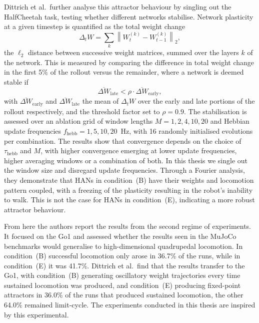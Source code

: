 \documentclass{article} %
\begin{document}
Dittrich et al.\ further analyse this attractor behaviour by singling out the HalfCheetah task, testing whether different networks stabilise. Network plasticity at a given timestep is quantified as the total weight change
\begin{equation}
    \Delta_t W = \sum_k \left\lVert W_t^{(k)} - W_{t-1}^{(k)} \right\rVert_2 ,
    \label{eq:total-weight-change}
\end{equation}
the $\ell_2$ distance between successive weight matrices, summed over the layers $k$ of the network. This is measured by comparing the difference in total weight change in the first 5\% of the rollout versus the remainder, where a network is deemed stable if
\begin{equation}
    \overline{\Delta W}_{\mathrm{late}} < \rho \cdot \overline{\Delta W}_{\mathrm{early}} ,
    \label{eq:han-convergence}
\end{equation}
with $\overline{\Delta W}_{\mathrm{early}}$ and $\overline{\Delta W}_{\mathrm{late}}$ the mean of $\Delta_t W$ over the early and late portions of the rollout respectively, and the threshold factor set to $\rho = 0.9$. The stabilisation is assessed over an ablation grid of window lengths $M = 1, 2, 4, 10, 20$ and Hebbian update frequencies $f_{\mathrm{hebb}} = 1, 5, 10, 20$~Hz, with 16 randomly initialised evolutions per combination. The results show that convergence depends on the choice of $\tau_{\mathrm{hebb}}$ and $M$, with higher convergence emerging at lower update frequencies, higher averaging windows or a combination of both. In this thesis we single out the window size and disregard update frequencies. Through a Fourier analysis, they demonstrate that HANs in condition~(B) have their weights and locomotion pattern coupled, with a freezing of the plasticity resulting in the robot's inability to walk. This is not the case for HANs in condition~(E), indicating a more robust attractor behaviour.

From here the authors report the results from the second regime of experiments. It focused on the Go1 and assessed whether the results seen in the MuJoCo benchmarks would generalise to high-dimensional quadrupedal locomotion. In condition~(B) successful locomotion only arose in 36.7\% of the runs, while in condition~(E) it was 41.7\%. Dittrich et al.\ find that the results transfer to the Go1, with condition~(B) generating oscillatory weight trajectories every time sustained locomotion was produced, and condition~(E) producing fixed-point attractors in 36.0\% of the runs that produced sustained locomotion, the other 64.0\% remained limit-cycle. The experiments conducted in this thesis are inspired by this experimental.
\end{document}
